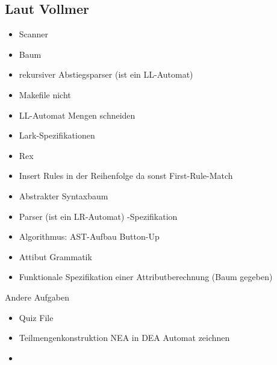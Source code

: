 \subsection{Laut Vollmer}
\begin{itemize}
  \item Scanner
  \item Baum
  \item rekursiver Abstiegsparser (ist ein LL-Automat)
  \item Makefile nicht
  \item LL-Automat Mengen schneiden
  \item Lark-Spezifikationen
  \item Rex
  \item Insert Rules in der Reihenfolge da sonst First-Rule-Match
  \item Abstrakter Syntaxbaum
  \item Parser (ist ein LR-Automat) -Spezifikation
  \item Algorithmus: AST-Aufbau Button-Up
  \item Attibut Grammatik 
  \item Funktionale Spezifikation einer Attributberechnung (Baum gegeben)
\end{itemize}
Andere Aufgaben
\begin{itemize}
  \item Quiz File
  \item Teilmengenkonstruktion NEA in DEA Automat zeichnen
  \item 
\end{itemize}